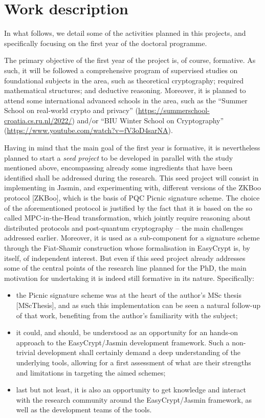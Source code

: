 \documentclass[preprint]{iacrtrans}
\begin{document}
\section*{Work description}

In what follows, we detail some of the activities planned in this
projects, and specifically focusing on the first year of the
doctoral programme.

The primary objective of the first year of the project is, of course,
formative. As such, it will be followed a comprehensive program of
supervised studies on foundational subjects in the area, such as
theoretical cryptography; required mathematical structures; and
deductive reasoning. Moreover, it is planned to attend some
international advanced schools in the area, such as the ``Summer
School on real-world crypto and privacy''
(\url{https://summerschool-croatia.cs.ru.nl/2022/}) and/or ``BIU
Winter School on Cryptography''
(\url{https://www.youtube.com/watch?v=fV3oD4sarNA}).

Having in mind that the main goal of the first year is formative, it
is nevertheless planned to start a \emph{seed project} to be developed
in parallel with the study mentioned above, encompassing already some
ingredients that have been identified shall be addressed during the
research. This seed project will consist in implementing in Jasmin, and
experimenting with, different versions of the ZKBoo protocol [ZKBoo],
which is the basis of PQC Picnic signature scheme. The choice of the
aforementioned protocol is justified by the fact that it is based on
the so called MPC-in-the-Head transformation, which jointly require
reasoning about distributed protocols and post-quantum cryptography --
the main challenges addressed earlier. Moreover, it is used as a
sub-component for a signature scheme through the Fiat-Shamir
construction whose formalisation in EasyCrypt is, by itself, of
independent interest.  But even if this seed project already addresses
some of the central points of the research line planned for the PhD,
the main motivation for undertaking it is indeed still formative in
its nature. Specifically:
\begin{itemize}
\item the Picnic signature scheme was at the heart of the author's MSc
  thesis [MScThesis], and as such this implementation can be seen a
  natural follow-up of that work, benefiting from the author's
  familiarity with the subject;
\item it could, and should, be understood as an opportunity for an
  hands-on approach to the EasyCrypt/Jasmin development
  framework. Such a non-trivial development shall certainly demand a
  deep understanding of the underlying tools, allowing for a first
  assessment of what are their strengths and limitations in targeting
  the aimed schemes;
\item last but not least, it is also an opportunity to get knowledge
  and interact with the research community around the EasyCrypt/Jasmin
  framework, as well as the development teams of the tools.
\end{itemize}




\printbibliography{}
\end{document}
